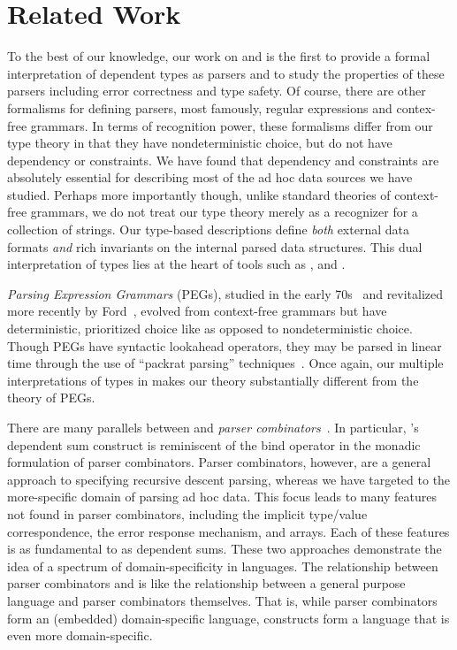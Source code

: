 \section{Related Work}
\label{sec:related}

To the best of our knowledge, our work on \ddcold{} and \ddc{} is the
first to provide a formal interpretation of dependent types as parsers
and to study the properties of these parsers including error
correctness and type safety. Of course, there are other formalisms for
defining parsers, most famously, regular expressions and contex-free
grammars.  In terms of recognition power, these formalisms differ from
our type theory in that they have nondeterministic choice, but do not
have dependency or constraints.  We have found that dependency and
constraints are absolutely essential for describing most of the ad hoc
data sources we have studied.  Perhaps more importantly though, unlike
standard theories of context-free grammars, we do not treat our type
theory merely as a recognizer for a collection of strings.  Our
type-based descriptions define {\em both} external data formats {\em
  and} rich invariants on the internal parsed data structures.  This
dual interpretation of types lies at the heart of tools such as \pads,
\datascript{} and \packettypes{}.

{\em Parsing Expression Grammars} (PEGs), studied in the early
70s~\cite{birman+:parsing} and revitalized more recently by
Ford~\cite{ford:pegs}, evolved from context-free grammars but have
deterministic, prioritized choice like \ddc{} as opposed to
nondeterministic choice.  Though PEGs have syntactic lookahead
operators, they may be parsed in linear time through the use of
``packrat parsing'' techniques~\cite{ford:packrat,grimm:packrat}.
Once again, our multiple interpretations of types in \ddc{} makes our
theory substantially different from the theory of PEGs.

There are many parallels between \ddc{} and {\it parser
  combinators}~\cite{burge:parser-combinators,hutton+:parser-combinators}.
In particular, \ddc{}'s dependent sum construct is reminiscent of the
bind operator in the monadic formulation of parser combinators.
Parser combinators, however, are a general approach to specifying
recursive descent parsing, whereas we have targeted \ddc{} to the
more-specific domain of parsing ad hoc data. This focus leads to many
features not found in parser combinators, including the implicit
type/value correspondence, the error response mechanism, and arrays.
Each of these features is as fundamental to \ddc{} as dependent sums.
These two approaches demonstrate the idea of a spectrum of
domain-specificity in languages. The relationship between parser
combinators and \ddc{} is like the relationship between a general
purpose language and parser combinators themselves. That is, while
parser combinators form an (embedded) domain-specific language, \ddc{}
constructs form a language that is even more domain-specific.
